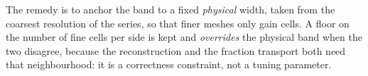 
The remedy is to anchor the band to a fixed \emph{physical} width, taken from
the coarsest resolution of the series, so that finer meshes only gain cells.
A floor on the number of fine cells per side is kept and \emph{overrides} the
physical band when the two disagree, because the reconstruction and the
fraction transport both need that neighbourhood: it is a correctness
constraint, not a tuning parameter.
